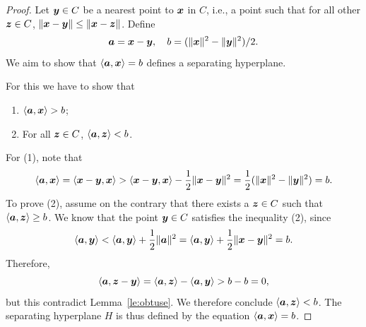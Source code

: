 \begin{proof}
 Let $\bm{y}\in C$ be a nearest point to $\bm{x}$ in $C$, i.e., a point such that for all other $\bm{z}\in C$, $\Vert {\bm{x}-\bm{y}}\Vert\leq \Vert {\bm{x}-\bm{z}}\Vert$. Define
 \begin{equation*}
  \bm{a}= \bm{x}-\bm{y}, \quad b = (\Vert {\bm{x}}\Vert^2-\Vert {\bm{y}}\Vert^2)/2.
 \end{equation*}
We aim to show that $\langle {\bm{a}}, {\bm{x}} \rangle = b$ defines a separating hyperplane. 

For this we have to show that
\begin{enumerate}
 \item $\langle {\bm{a}}, {\bm{x}} \rangle>b$;
 \item For all $\bm{z}\in C$, $\langle {\bm{a}}, {\bm{z}} \rangle<b$.
\end{enumerate}
For (1), note that 
\begin{equation*}
 \langle {\bm{a}}, {\bm{x}} \rangle = \langle {\bm{x}-\bm{y}}, {\bm{x}} \rangle>\langle {\bm{x}-\bm{y}}, {\bm{x}} \rangle-\frac{1}{2}\Vert {\bm{x}-\bm{y}}\Vert^2 = \frac{1}{2}(\Vert {\bm{x}}\Vert^2-\Vert {\bm{y}}\Vert^2) = b.
\end{equation*}
To prove (2), assume on the contrary that there exists a $\bm{z}\in C$ such that $\langle {\bm{a}}, {\bm{z}} \rangle\geq b$. We know that the point $\bm{y}\in C$ satisfies the inequality (2), since
\begin{equation*}
 \langle {\bm{a}}, {\bm{y}} \rangle < \langle {\bm{a}}, {\bm{y}} \rangle+\frac{1}{2}\Vert {\bm{a}}\Vert^2 = \langle {\bm{a}}, {\bm{y}} \rangle+\frac{1}{2}\Vert {\bm{x}-\bm{y}}\Vert^2 = b.
\end{equation*}
Therefore, 
\begin{equation*}
 \langle {\bm{a}}, {\bm{z}-\bm{y}} \rangle = \langle {\bm{a}}, {\bm{z}} \rangle-\langle {\bm{a}}, {\bm{y}} \rangle > b-b = 0,
\end{equation*}
but this contradict Lemma~\ref{le:obtuse}. We therefore conclude $\langle {\bm{a}}, {\bm{z}} \rangle<b$. The separating hyperplane $H$ is thus defined by the equation $\langle {\bm{a}}, {\bm{x}} \rangle=b$. 
\end{proof}

